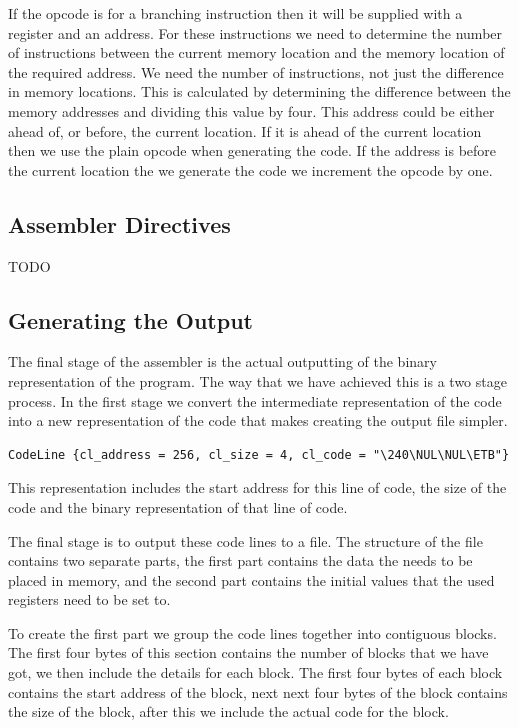 \documentclass[a4paper,11pt]{report}
\begin{document}
If the opcode is for a branching instruction then it will be supplied with a register and an address. For these instructions we need to determine the number of instructions between the current memory location and the memory location of the required address. We need the number of instructions, not just the difference in memory locations. This is calculated by determining the difference between the memory addresses and dividing this value by four. This address could be either ahead of, or before, the current location. If it is ahead of the current location then we use the plain opcode when generating the code. If the address is before the current location the we generate the code we increment the opcode by one.
\subsection{Assembler Directives}
TODO
\subsection{Generating the Output}
The final stage of the assembler is the actual outputting of the binary representation of the program. The way that we have achieved this is a two stage process. In the first stage we convert the intermediate representation of the code into a new representation of the code that makes creating the output file simpler.

\begin{lstlisting}[basicstyle=\ttfamily\tiny]
CodeLine {cl_address = 256, cl_size = 4, cl_code = "\240\NUL\NUL\ETB"}
\end{lstlisting}

This representation includes the start address for this line of code, the size of the code and the binary representation of that line of code.

The final stage is to output these code lines to a file. The structure of the file contains two separate parts, the first part contains the data the needs to be placed in memory, and the second part contains the initial values that the used registers need to be set to.

To create the first part we group the code lines together into contiguous blocks. The first four bytes of this section contains the number of blocks that we have got, we then include the details for each block. The first four bytes of each block contains the start address of the block, next next four bytes of the block contains the size of the block, after this we include the actual code for the block.
\end{document}
